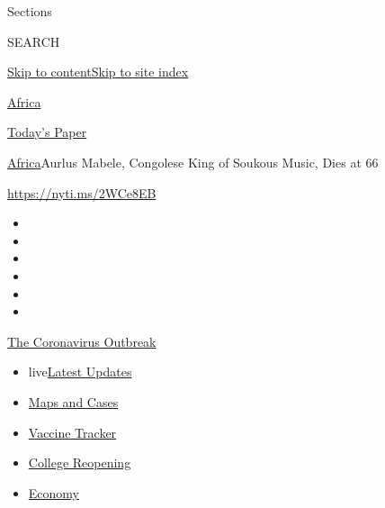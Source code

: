Sections

SEARCH

\protect\hyperlink{site-content}{Skip to
content}\protect\hyperlink{site-index}{Skip to site index}

\href{https://www.nytimes.com/section/world/africa}{Africa}

\href{https://myaccount.nytimes.com/auth/login?response_type=cookie\&client_id=vi}{}

\href{https://www.nytimes.com/section/todayspaper}{Today's Paper}

\href{/section/world/africa}{Africa}\textbar{}Aurlus Mabele, Congolese
King of Soukous Music, Dies at 66

\url{https://nyti.ms/2WCe8EB}

\begin{itemize}
\item
\item
\item
\item
\item
\item
\end{itemize}

\href{https://www.nytimes.com/news-event/coronavirus?action=click\&pgtype=Article\&state=default\&region=TOP_BANNER\&context=storylines_menu}{The
Coronavirus Outbreak}

\begin{itemize}
\tightlist
\item
  live\href{https://www.nytimes.com/2020/08/03/world/coronavirus-covid-19.html?action=click\&pgtype=Article\&state=default\&region=TOP_BANNER\&context=storylines_menu}{Latest
  Updates}
\item
  \href{https://www.nytimes.com/interactive/2020/us/coronavirus-us-cases.html?action=click\&pgtype=Article\&state=default\&region=TOP_BANNER\&context=storylines_menu}{Maps
  and Cases}
\item
  \href{https://www.nytimes.com/interactive/2020/science/coronavirus-vaccine-tracker.html?action=click\&pgtype=Article\&state=default\&region=TOP_BANNER\&context=storylines_menu}{Vaccine
  Tracker}
\item
  \href{https://www.nytimes.com/2020/08/02/us/covid-college-reopening.html?action=click\&pgtype=Article\&state=default\&region=TOP_BANNER\&context=storylines_menu}{College
  Reopening}
\item
  \href{https://www.nytimes.com/live/2020/08/03/business/stock-market-today-coronavirus?action=click\&pgtype=Article\&state=default\&region=TOP_BANNER\&context=storylines_menu}{Economy}
\end{itemize}

